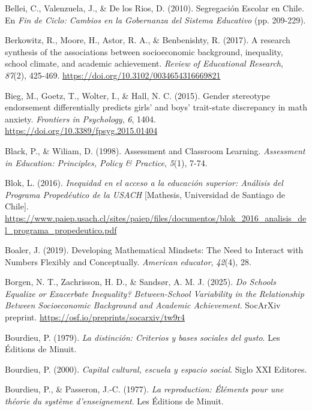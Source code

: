 \documentclass[
  spanish,
  a4paper,
  oneside]{scrbook}
\newlength{\cslhangindent}
\newenvironment{CSLReferences}[2] %
 {\begin{list}{}{%
  \setlength{\itemindent}{0pt}
  \setlength{\leftmargin}{0pt}
  \setlength{\parsep}{0pt}
  \ifodd #1
   \setlength{\leftmargin}{\cslhangindent}
   \setlength{\itemindent}{-1\cslhangindent}
  \fi
  \setlength{\itemsep}{#2\baselineskip}}}
 {\end{list}}
\begin{document}
\begin{CSLReferences}{1}{0}
Bellei, C., Valenzuela, J., \& De los Rios, D. (2010). Segregación
Escolar en Chile. En \emph{Fin de Ciclo: Cambios en la Gobernanza del
Sistema Educativo} (pp. 209-229).

Berkowitz, R., Moore, H., Astor, R. A., \& Benbenishty, R. (2017). A
research synthesis of the associations between socioeconomic background,
inequality, school climate, and academic achievement. \emph{Review of
Educational Research}, \emph{87}(2), 425-469.
\url{https://doi.org/10.3102/0034654316669821}

Bieg, M., Goetz, T., Wolter, I., \& Hall, N. C. (2015). Gender
stereotype endorsement differentially predicts girls' and boys'
trait-state discrepancy in math anxiety. \emph{Frontiers in Psychology},
\emph{6}, 1404. \url{https://doi.org/10.3389/fpsyg.2015.01404}

Black, P., \& Wiliam, D. (1998). Assessment and Classroom Learning.
\emph{Assessment in Education: Principles, Policy \& Practice},
\emph{5}(1), 7-74.

Blok, L. (2016). \emph{Inequidad en el acceso a la educación superior:
Análisis del Programa Propedéutico de la USACH} {[}Mathesis, Universidad
de Santiago de Chile{]}.
\url{https://www.paiep.usach.cl/sites/paiep/files/documentos/blok_2016_analisis_del_programa_propedeutico.pdf}

Boaler, J. (2019). Developing Mathematical Mindsets: The Need to
Interact with Numbers Flexibly and Conceptually. \emph{American
educator}, \emph{42}(4), 28.

Borgen, N. T., Zachrisson, H. D., \& Sandsør, A. M. J. (2025). \emph{Do
Schools Equalize or Exacerbate Inequality? Between-School Variability in
the Relationship Between Socioeconomic Background and Academic
Achievement}. SocArXiv preprint.
\url{https://osf.io/preprints/socarxiv/tw9r4}

Bourdieu, P. (1979). \emph{La distinción: Criterios y bases sociales del
gusto}. Les Éditions de Minuit.

Bourdieu, P. (2000). \emph{Capital cultural, escuela y espacio social}.
Siglo XXI Editores.

Bourdieu, P., \& Passeron, J.-C. (1977). \emph{La reproduction:
{É}l{é}ments pour une th{é}orie du syst{è}me d'enseignement}. Les
{É}ditions de Minuit.


\end{CSLReferences}
\end{document}
